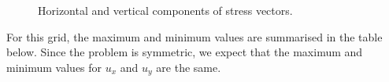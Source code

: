 \documentclass{article}
\numberwithin{equation}{section}
\theoremstyle{definition}
\begin{document}
\begin{figure}[H]
    \centering
    \hfill

    \hfill
    \caption{Horizontal and vertical components of stress vectors.}
    \label{fig:fig7}
\end{figure}
For this grid, the maximum and minimum values are summarised in the table below. Since the problem is symmetric, we expect that the maximum and minimum values for $u_x$ and $u_y$ are the same.
\end{document}

